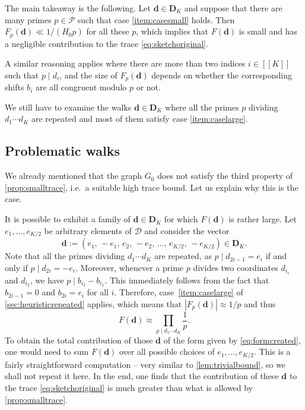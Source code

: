 \documentclass[11pt]{amsart}
\theoremstyle{definition}
\newcommand{\sinterval}[1]{[\![#1]\!] }
\newcommand{\abs}[1]{\left|#1\right|}
\newcommand{\primes}{\mathcal{P}}
\newcommand{\D}{\mathcal{D}}
\renewcommand{\d}{\boldsymbol{d}}
\newcommand{\graph}{G}
\newcommand{\sommespart}{b}
\newcommand{\fancyD}{\mathbf{D}}
\newcommand{\Dsf}{\fancyD_{\!\repK}}
\newcommand{\repK}{K}
\newcommand{\newK}{\sinterval{K}}
\begin{document}
The main takeaway is the following. Let $\d \in \Dsf$ and suppose that there are many primes $p\in \primes$ such that case \cref{item:casesmall} holds. Then $F_p(\d) \ll 1/(H_0p)$ for all these $p$, which implies that $F(\d)$ is small and has a negligible contribution to the trace \cref{eq:sketchoriginal}.

A similar reasoning applies where there are more than two indices $i\in \newK$ such that $p\mid d_i$, and the size of $F_p(\d)$ depends on whether the corresponding shifts $\sommespart_i$ are all congruent modulo $p$ or not.

We still have to examine the walks $\d \in \Dsf$ where all the primes $p$ dividing $d_1\cdots d_{\repK}$ are repeated and most of them satisfy case \cref{item:caselarge}.

\subsection{Problematic walks}
\label{rem:obstruction1}
We already mentioned that the graph $\graph_0$ does not satisfy the third property of \cref{prop:smalltrace}, i.e.~a suitable high trace bound. Let us explain why this is the case. 

It is possible to exhibit a family of $\d \in \Dsf$ for which $F(\d)$ is rather large. Let $e_1, \ldots, e_{\repK/2}$ be arbitrary elements of $\D$ and consider the vector 
\begin{equation}
\label{eq:formcreated}
	\d := (e_1,\, -e_1,\, e_2,\, -e_2,\, \ldots,\, e_{\repK/2},\, -e_{\repK/2}) \in \Dsf.
\end{equation}
Note that all the primes dividing $d_1\cdots d_{\repK}$ are repeated, as $p \mid d_{2i-1} = e_i$ if and only if $p\mid d_{2i} = -e_i$. Moreover, whenever a prime $p$ divides two coordinates $d_{i_1}$ and $d_{i_2}$, we have $p\mid \sommespart_{i_2} - \sommespart_{i_1}$. This immediately follows from the fact that $\sommespart_{2i-1} = 0$ and $\sommespart_{2i} = e_i$ for all $i$. Therefore, case~\cref{item:caselarge} of \cref{sec:heuristicrepeated} applies, which means that $\abs{F_p(\d)} \approx 1/p$ and thus
\begin{equation*}
	F(\d) \approx \prod_{p\mid d_1\cdots d_{\repK}} \frac{1}{p}. 
\end{equation*}
To obtain the total contribution of those $\d$ of the form given by \cref{eq:formcreated}, one would need to sum $F(\d)$ over all possible choices of $e_1, \ldots, e_{\repK/2}$. This is a fairly straightforward computation -- very similar to \cref{lem:trivialbound}, so we shall not repeat it here. In the end, one finds that the contribution of these $\d$ to the trace \cref{eq:sketchoriginal} is much greater than what is allowed by \cref{prop:smalltrace}.
\end{document}
